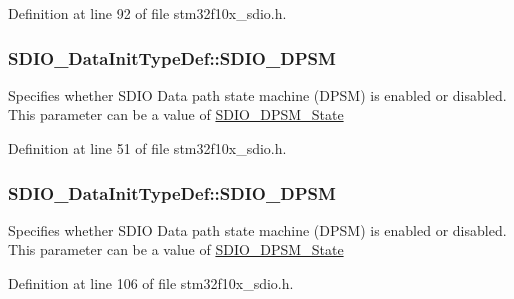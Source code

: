Definition at line 92 of file stm32f10x\+\_\+sdio.\+h.

\subsubsection[{\texorpdfstring{S\+D\+I\+O\+\_\+\+D\+P\+SM}{SDIO_DPSM}}]{ S\+D\+I\+O\+\_\+\+Data\+Init\+Type\+Def\+::\+S\+D\+I\+O\+\_\+\+D\+P\+SM}\hypertarget{struct_s_d_i_o___data_init_type_def_a0de3d8b89bfffea23524f83ebb824438}{}\label{struct_s_d_i_o___data_init_type_def_a0de3d8b89bfffea23524f83ebb824438}
Specifies whether S\+D\+IO Data path state machine (D\+P\+SM) is enabled or disabled. This parameter can be a value of \hyperlink{group___s_d_i_o___d_p_s_m___state}{S\+D\+I\+O\+\_\+\+D\+P\+S\+M\+\_\+\+State} 

Definition at line 51 of file stm32f10x\+\_\+sdio.\+h.

\subsubsection[{\texorpdfstring{S\+D\+I\+O\+\_\+\+D\+P\+SM}{SDIO_DPSM}}]{ S\+D\+I\+O\+\_\+\+Data\+Init\+Type\+Def\+::\+S\+D\+I\+O\+\_\+\+D\+P\+SM}\hypertarget{struct_s_d_i_o___data_init_type_def_ad5eb5f3c6fd9e5d4a6664c5cf57d6b03}{}\label{struct_s_d_i_o___data_init_type_def_ad5eb5f3c6fd9e5d4a6664c5cf57d6b03}
Specifies whether S\+D\+IO Data path state machine (D\+P\+SM) is enabled or disabled. This parameter can be a value of \hyperlink{group___s_d_i_o___d_p_s_m___state}{S\+D\+I\+O\+\_\+\+D\+P\+S\+M\+\_\+\+State} 

Definition at line 106 of file stm32f10x\+\_\+sdio.\+h.

